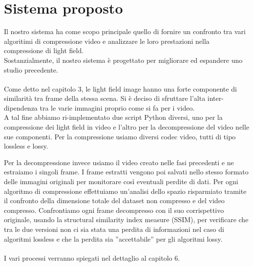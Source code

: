 \chapter{Sistema proposto}
Il nostro sistema ha come scopo principale quello di fornire un confronto tra vari algoritimi di compressione video e analizzare le loro prestazioni nella compressione di light field.
\\
Sostanzialmente, il nostro sistema è progettato per migliorare ed espandere uno studio precedente.
\\
\\
Come detto nel capitolo 3, le light field image hanno una forte componente di similarità tra frame della stessa scena. Si è deciso di sfruttare l’alta inter-dipendenza tra le varie immagini proprio come si fa per i video. 
\\
A tal fine abbiamo ri-implementato due script Python diversi, uno per la compressione dei light field in video e l’altro per la decompressione del video nelle sue componenti. Per la compressione usiamo diversi codec video, tutti di tipo lossless e lossy.

Per la decompressione invece usiamo il video creato nelle fasi precedenti e ne estraiamo i singoli frame. I frame estratti vengono poi salvati nello stesso formato delle immagini originali per monitorare così eventuali perdite di dati. Per ogni algoritmo di compressione effettuiamo un’analisi dello spazio risparmiato tramite il confronto della dimensione totale del dataset non compresso e del video compresso. Confrontiamo ogni frame decompresso con il suo corrispettivo originale, usando la structural similarity index measure (SSIM), per verificare che tra le due versioni non ci sia stata una perdita di informazioni nel caso di algoritmi lossless e che la perdita sia ”accettabile” per gli algoritmi lossy.
\\
\\
I vari processi verranno spiegati nel dettaglio al capitolo 6.
 